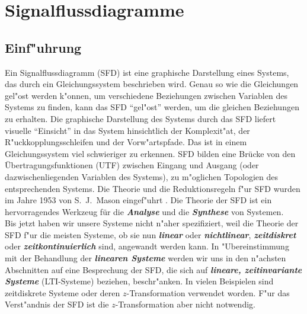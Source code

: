 \renewcommand{\thesection}{\thechapter.\arabic{section}}
\setcounter{Aufgabe}{0}\setcounter{Beispiel}{0}
\chapter{Signalflussdiagramme }\label{KAP_SFD} 
\section{Einf"uhrung} 
Ein Signalflussdiagramm
(SFD) ist eine graphische
Darstellung eines Systems, das durch ein Gleichungssystem beschrieben
wird. Genau so wie die Gleichungen gel"ost werden k"onnen, um
verschiedene Beziehungen zwischen Variablen des Systems zu finden,
kann das SFD ``gel"ost'' werden, um die gleichen Beziehungen zu
erhalten. Die graphische Darstellung des Systems durch das SFD liefert
visuelle ``Einsicht'' in das System hinsichtlich der
Komplexit"at, der
R"uckkopplungsschleifen  und der
Vorw"artspfade. Das ist in einem
Gleichungssystem viel schwieriger zu erkennen.
SFD bilden eine Br\"ucke von den
\"Ubertragungsfunktionen (UTF)
zwischen Eingang und Ausgang (oder dazwischenliegenden Variablen des
Systems), zu m"oglichen Topologien des entsprechenden
Systems. Die Theorie und die Reduktionsregeln f"ur SFD wurden im Jahre
1953 von S.~J.~Mason eingef"uhrt \cite{MOS:97}. Die Theorie der SFD
ist ein hervorragendes Werkzeug f\"ur die {\it\textbf{Analyse}} und die {\it\textbf{Synthese}} von
Systemen.\\
\nit Bis jetzt haben wir unsere Systeme nicht n"aher spezifiziert,
weil die Theorie der SFD f"ur die meisten Systeme, ob sie nun
{\it\textbf{linear}} oder {\it\textbf{nichtlinear}},
{\it\textbf{zeitdiskret}} oder {\it\textbf{zeitkontinuierlich}} sind,
angewandt werden kann. In "Ubereinstimmung mit der Behandlung der
{\it\textbf{linearen Systeme}} werden wir uns in den n"achsten
Abschnitten auf eine Besprechung der SFD, die sich auf
{\it\textbf{lineare, zeitinvariante Systeme}} (LTI-Systeme) beziehen,
beschr"anken. In vielen Beispielen sind zeitdiskrete
Systeme oder deren
$z$-Transformation verwendet worden.  F"ur
das Verst"andnis der SFD ist die $z$-Transformation aber
nicht notwendig.

